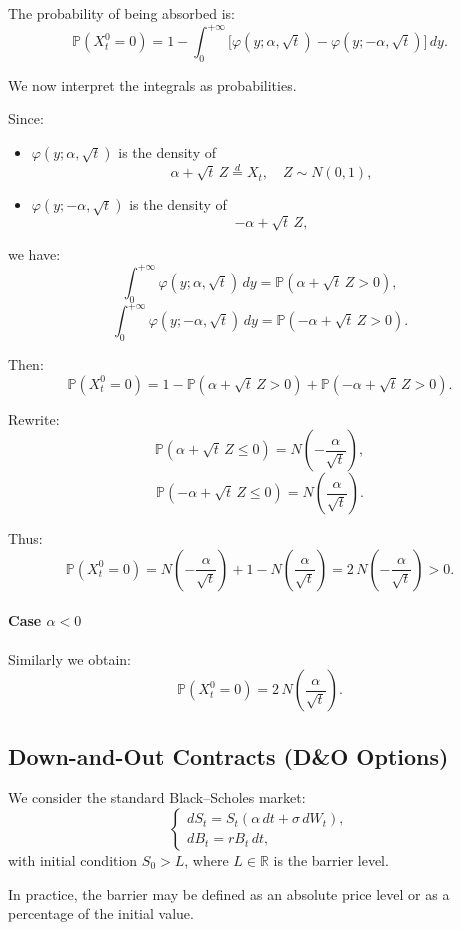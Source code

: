 \documentclass[12pt,a4paper]{article}
\theoremstyle{definition}
\begin{document}
The probability of being absorbed is:
\[
\mathbb{P}(X_t^0 = 0) = 1 - \int_0^{+\infty} \big[\varphi(y; \alpha, \sqrt{t}) - \varphi(y; -\alpha, \sqrt{t})\big]\, dy.
\]

We now interpret the integrals as probabilities.

Since:
\begin{itemize}
\item $\varphi(y; \alpha, \sqrt{t})$ is the density of
\[
\alpha + \sqrt{t}\, Z \stackrel{d}{=} X_t, \quad Z \sim N(0, 1),
\]
\item $\varphi(y; -\alpha, \sqrt{t})$ is the density of
\[
-\alpha + \sqrt{t}\, Z,
\]
\end{itemize}
we have:
\[
\int_0^{+\infty} \varphi(y; \alpha, \sqrt{t})\, dy = \mathbb{P}(\alpha + \sqrt{t}\, Z > 0),
\]
\[
\int_0^{+\infty} \varphi(y; -\alpha, \sqrt{t})\, dy = \mathbb{P}(-\alpha + \sqrt{t}\, Z > 0).
\]

Then:
\[
\mathbb{P}(X_t^0 = 0) = 1 - \mathbb{P}(\alpha + \sqrt{t}\, Z > 0) + \mathbb{P}(-\alpha + \sqrt{t}\, Z > 0).
\]

Rewrite:
\[
\mathbb{P}(\alpha + \sqrt{t}\, Z \leq 0) = N\!\left(-\frac{\alpha}{\sqrt{t}}\right),
\]
\[
\mathbb{P}(-\alpha + \sqrt{t}\, Z \leq 0) = N\!\left(\frac{\alpha}{\sqrt{t}}\right).
\]

Thus:
\[
\mathbb{P}(X_t^0 = 0) = N\!\left(-\frac{\alpha}{\sqrt{t}}\right) + 1 - N\!\left(\frac{\alpha}{\sqrt{t}}\right) = 2\, N\!\left(-\frac{\alpha}{\sqrt{t}}\right) > 0.
\]

\paragraph{Case $\alpha < 0$}

Similarly we obtain:
\[
\mathbb{P}(X_t^0 = 0) = 2\, N\!\left(\frac{\alpha}{\sqrt{t}}\right).
\]

\subsection{Down-and-Out Contracts (D\&O Options)}

We consider the standard Black--Scholes market:
\[
\begin{cases}
dS_t = S_t(\alpha\, dt + \sigma\, dW_t), \\
dB_t = r B_t\, dt,
\end{cases}
\]
with initial condition $S_0 > L$, where $L \in \mathbb{R}$ is the barrier level.

In practice, the barrier may be defined as an absolute price level or as a percentage of the initial value.
\end{document}
